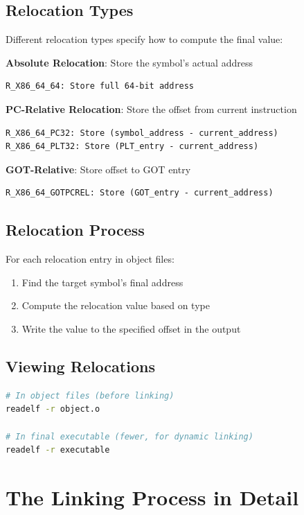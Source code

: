 \subsection{Relocation Types}

Different relocation types specify how to compute the final value:

\textbf{Absolute Relocation}: Store the symbol's actual address
\begin{verbatim}
R_X86_64_64: Store full 64-bit address
\end{verbatim}

\textbf{PC-Relative Relocation}: Store the offset from current instruction
\begin{verbatim}
R_X86_64_PC32: Store (symbol_address - current_address)
R_X86_64_PLT32: Store (PLT_entry - current_address)
\end{verbatim}

\textbf{GOT-Relative}: Store offset to GOT entry
\begin{verbatim}
R_X86_64_GOTPCREL: Store (GOT_entry - current_address)
\end{verbatim}

\subsection{Relocation Process}

For each relocation entry in object files:

\begin{enumerate}
    \item Find the target symbol's final address
    \item Compute the relocation value based on type
    \item Write the value to the specified offset in the output
\end{enumerate}

\subsection{Viewing Relocations}

\begin{lstlisting}[language=bash]
# In object files (before linking)
readelf -r object.o

# In final executable (fewer, for dynamic linking)
readelf -r executable
\end{lstlisting}

\section{The Linking Process in Detail}

